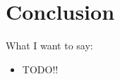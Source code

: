 
\chapter{Conclusion}\label{chapter:conclusion}

What I want to say:

\begin{itemize}
    \item TODO!!
\end{itemize}